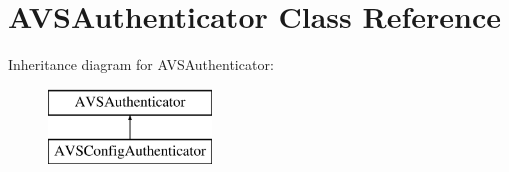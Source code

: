 \hypertarget{classAVSAuthenticator}{}\section{A\+V\+S\+Authenticator Class Reference}
\label{classAVSAuthenticator}
Inheritance diagram for A\+V\+S\+Authenticator\+:\begin{figure}[H]
\begin{center}
\leavevmode
\includegraphics[height=2.000000cm]{d7/df0/classAVSAuthenticator}
\end{center}
\end{figure}
